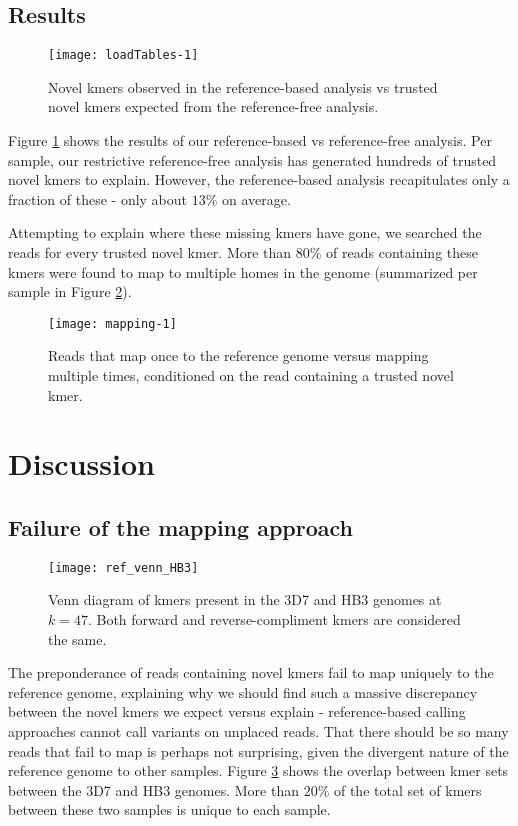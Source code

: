 \subsection{Results}

\begin{figure}[h!]
  \centering
    \texttt{[image: loadTables-1]}
  \caption{Novel kmers observed in the reference-based analysis vs trusted novel kmers expected from the reference-free analysis.}
  \label{fig:obs_vs_exp_kmers}
\end{figure}

Figure \ref{fig:obs_vs_exp_kmers} shows the results of our reference-based vs reference-free analysis.  Per sample, our restrictive reference-free analysis has generated hundreds of trusted novel kmers to explain.  However, the reference-based analysis recapitulates only a fraction of these - only about $13\%$ on average.

Attempting to explain where these missing kmers have gone, we searched the reads for every trusted novel kmer.  More than $80\%$ of reads containing these kmers were found to map to multiple homes in the genome (summarized per sample in Figure \ref{fig:mapping}).

\begin{figure}[h!]
  \centering
    \texttt{[image: mapping-1]}
  \caption{Reads that map once to the reference genome versus mapping multiple times, conditioned on the read containing a trusted novel kmer.}
  \label{fig:mapping}
\end{figure}

\section{Discussion}
\subsection{Failure of the mapping approach}

\begin{figure}[h!]
  \centering
    \texttt{[image: ref\_venn\_HB3]}
  \caption{Venn diagram of kmers present in the 3D7 and HB3 genomes at $k=47$.  Both forward and reverse-compliment kmers are considered the same.}
  \label{fig:ref_venn_HB3}
\end{figure}

The preponderance of reads containing novel kmers fail to map uniquely to the reference genome, explaining why we should find such a massive discrepancy between the novel kmers we expect versus explain - reference-based calling approaches cannot call variants on unplaced reads.  That there should be so many reads that fail to map is perhaps not surprising, given the divergent nature of the reference genome to other samples.  Figure \ref{fig:ref_venn_HB3} shows the overlap between kmer sets between the 3D7 and HB3 genomes.  More than $20\%$ of the total set of kmers between these two samples is unique to each sample.

